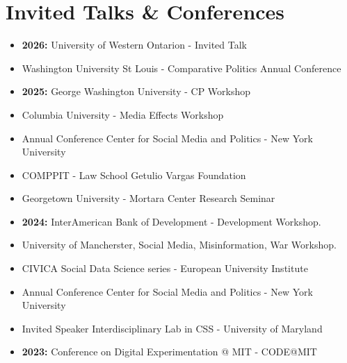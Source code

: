 \documentclass[letterpaper, 11pt]{article}
\begin{document}
 \section*{Invited Talks \& Conferences}
    \begin{itemize}[leftmargin=0cm, noitemsep]

     \item \textbf{2026:} \hspace{.02cm} University of Western Ontarion - Invited Talk
         \item \hspace{1.25cm} Washington University St Louis - Comparative Politics Annual Conference

     \item \textbf{2025:} \hspace{.02cm} George Washington University - CP Workshop
    \item \hspace{1.25cm} Columbia University - Media Effects Workshop
    \item \hspace{1.25cm} Annual Conference Center for Social Media and Politics - New York University
    \item \hspace{1.25cm} COMPPIT - Law School Getulio Vargas Foundation
    \item \hspace{1.25cm} Georgetown University - Mortara Center Research Seminar
    \item \textbf{2024:} \hspace{.02cm} InterAmerican Bank of Development - Development Workshop.
    \item \hspace{1.25cm} University of Mancherster, Social Media, Misinformation, War Workshop.
    \item \hspace{1.25cm} CIVICA Social Data Science series - European University Institute
     \item \hspace{1.25cm} Annual Conference Center for Social Media and Politics - New York University
      \item \hspace{1.25cm} Invited Speaker Interdisciplinary Lab in CSS - University of Maryland
    \item \textbf{2023:} \hspace{.02cm} Conference on Digital Experimentation @ MIT - CODE@MIT

\end{itemize}
\end{document}
